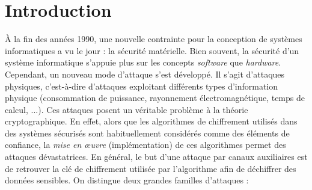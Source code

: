 \documentclass[oneside]{book}
\begin{document}
\section{Introduction}
\label{sec:att}

\vspace{-0.1 cm}À la fin des années 1990, une nouvelle contrainte pour la conception de systèmes informatiques a vu le jour : la sécurité matérielle. Bien souvent, la sécurité d'un système informatique s'appuie plus sur les concepts \textit{software} que \textit{hardware}. Cependant, un nouveau mode d'attaque s'est développé. Il s'agit d'attaques physiques, c'est-à-dire d'attaques exploitant différents types d’information physique (consommation de puissance, rayonnement électromagnétique, temps de calcul, ...). Ces attaques posent un véritable problème à la théorie cryptographique. En effet, alors que les algorithmes de chiffrement utilisés dans des systèmes sécurisés sont habituellement considérés comme des éléments de confiance, la \textit{mise en œuvre} (implémentation) de ces algorithmes permet des attaques dévastatrices. En général, le but d'une attaque par canaux auxiliaires est de retrouver la clé de chiffrement utilisée par l'algorithme afin de déchiffrer des données sensibles. On distingue deux grandes familles d'attaques : 
\end{document}
